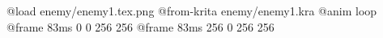 @load enemy/enemy1.tex.png
@from-krita enemy/enemy1.kra
@anim loop
	@frame 83ms 0 0 256 256
	@frame 83ms 256 0 256 256
